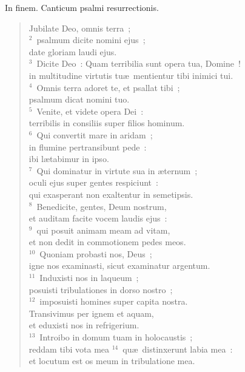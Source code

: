\bchapter
\lettrine[lines=3,image=true,loversize=0.05,lraise=-0.03]{I}{}n finem. Canticum psalmi resurrectionis. \begin{flushleft}\begin{verse}\vspace{6pt}Jubilate Deo, omnis terra~;\\
${}^{2}$~psalmum dicite nomini ejus~;\\ date gloriam laudi ejus.\\
${}^{3}$~Dicite Deo~: Quam terribilia sunt opera tua, Domine~!\\ in multitudine virtutis tu\ae\ mentientur tibi inimici tui.\\
${}^{4}$~Omnis terra adoret te, et psallat tibi~;\\ psalmum dicat nomini tuo.\\
${}^{5}$~Venite, et videte opera Dei~:\\ terribilis in consiliis super filios hominum.\\
${}^{6}$~Qui convertit mare in aridam~;\\ in flumine pertransibunt pede~:\\ ibi l\ae tabimur in ipso.\\
${}^{7}$~Qui dominatur in virtute sua in \ae ternum~;\\ oculi ejus super gentes respiciunt~:\\ qui exasperant non exaltentur in semetipsis.\\
${}^{8}$~Benedicite, gentes, Deum nostrum,\\ et auditam facite vocem laudis ejus~:\\
${}^{9}$~qui posuit animam meam ad vitam,\\ et non dedit in commotionem pedes meos.\\
${}^{10}$~Quoniam probasti nos, Deus~;\\ igne nos examinasti, sicut examinatur argentum.\\
${}^{11}$~Induxisti nos in laqueum~;\\ posuisti tribulationes in dorso nostro~;\\
${}^{12}$~imposuisti homines super capita nostra.\\ Transivimus per ignem et aquam,\\ et eduxisti nos in refrigerium.\\
${}^{13}$~Introibo in domum tuam in holocaustis~;\\ reddam tibi vota mea
${}^{14}$~qu\ae\ distinxerunt labia mea~:\\ et locutum est os meum in tribulatione mea.\\

\end{verse}
\end{flushleft}
